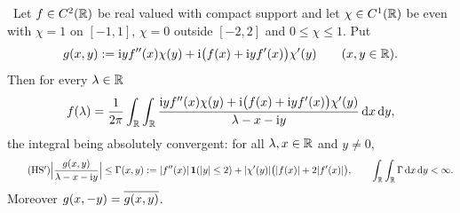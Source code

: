 \begin{lemma}\label{lem:HS} \infra\
Let $f\in C^2(\mathbb{R})$ be real valued with compact support and let $\chi\in C^1(\mathbb{R})$ be even with $\chi=1$ on $[-1,1]$, $\chi=0$ outside $[-2,2]$ and $0\le\chi\le1$. Put
\[
 g(x,y):=\mathrm{i} yf''(x)\chi(y)+\mathrm{i}\big(f(x)+\mathrm{i} yf'(x)\big)\chi'(y)\qquad(x,y\in\mathbb{R}).
\]
Then for every $\lambda\in\mathbb{R}$
\begin{equation}\label{eq:HS}
 f(\lambda)=\frac1{2\pi}\int_{\mathbb{R}}\int_{\mathbb{R}}\frac{\mathrm{i} yf''(x)\chi(y)+\mathrm{i}\big(f(x)+\mathrm{i} yf'(x)\big)\chi'(y)}{\lambda-x-\mathrm{i} y}\,\mathrm{d} x\,\mathrm{d} y,
\end{equation}
the integral being absolutely convergent: for all $\lambda,x\in\mathbb{R}$ and $y\ne0$,
\begin{equation}\tag{HS$'$}\label{eq:a1-HSdom}
 \Big|\frac{g(x,y)}{\lambda-x-\mathrm{i} y}\Big|\le\Gamma(x,y):=|f''(x)|\,\mathbf{1}(|y|\le2)+|\chi'(y)|\big(|f(x)|+2|f'(x)|\big),\qquad\int_{\mathbb{R}}\int_{\mathbb{R}}\Gamma\,\mathrm{d} x\,\mathrm{d} y<\infty .
\end{equation}
Moreover $g(x,-y)=\overline{g(x,y)}$.
\end{lemma}
